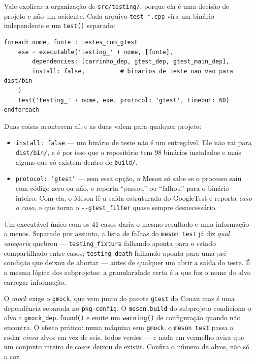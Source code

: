 Vale explicar a organização de \texttt{src/testing/}, porque ela é uma decisão
de projeto e não um acidente. Cada arquivo \texttt{test\_*.cpp} vira um binário
independente e um \texttt{test()} separado:

\begin{lstlisting}[style=bt, language=Meson,
    caption={Um alvo de teste por arquivo, em
             \texttt{src/testing/meson.build}.}]
foreach nome, fonte : testes_com_gtest
    exe = executable('testing_' + nome, [fonte],
        dependencies: [carrinho_dep, gtest_dep, gtest_main_dep],
        install: false,          # binarios de teste nao vao para dist/bin
    )
    test('testing_' + nome, exe, protocol: 'gtest', timeout: 60)
endforeach
\end{lstlisting}

Duas coisas acontecem aí, e as duas valem para qualquer projeto:

\begin{itemize}
    \item \texttt{install: false} --- um binário de teste não é um entregável.
          Ele não vai para \texttt{dist/bin/}, e é por isso que o repositório
          tem 98 binários instalados e mais alguns que só existem dentro de
          \texttt{build/}.
    \item \texttt{protocol: 'gtest'} --- sem essa opção, o Meson só sabe se o
          processo saiu com código zero ou não, e reporta ``passou'' ou
          ``falhou'' para o binário inteiro. Com ela, o Meson lê a saída
          estruturada do GoogleTest e reporta \emph{caso a caso}, o que torna
          o \texttt{-{}-gtest\_filter} quase sempre desnecessário.
\end{itemize}

\begin{porque}
Um executável único com os 41 casos daria o mesmo resultado e uma informação a
menos. Separado por assunto, a lista de falhas do \texttt{meson test} já diz
\emph{qual categoria} quebrou --- \texttt{testing\_fixture} falhando aponta
para o estado compartilhado entre casos; \texttt{testing\_death} falhando
aponta para uma pré-condição que deixou de abortar --- antes de qualquer um
abrir a saída do teste. É a mesma lógica dos subprojetos: a granularidade certa
é a que faz o nome do alvo carregar informação.
\end{porque}

\begin{armadilha}
O \emph{mock} exige o \texttt{gmock}, que vem junto do pacote \texttt{gtest} do
Conan mas é uma dependência separada no \texttt{pkg-config}. O
\texttt{meson.build} do subprojeto condiciona o alvo a
\texttt{gmock\_dep.found()} e emite um \texttt{warning()} de configuração
quando não encontra. O efeito prático: numa máquina sem \texttt{gmock}, o
\texttt{meson test} passa a rodar \emph{cinco} alvos em vez de seis, todos
verdes --- e nada em vermelho avisa que um conjunto inteiro de casos deixou de
existir. Confira o número de alvos, não só a cor.
\end{armadilha}

